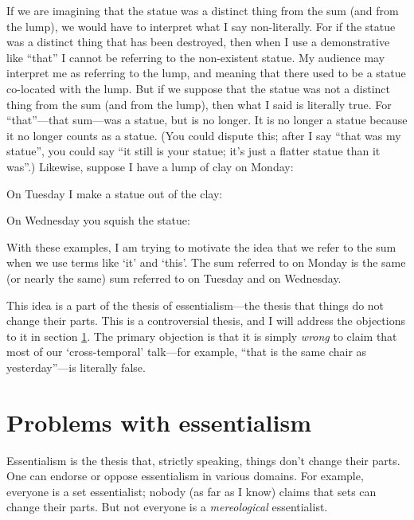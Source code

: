 \documentclass[11pt]{article}
\begin{document}
\begin{spacing}{1.5}
\begin{enumerate}
    If we are imagining that the statue was a distinct thing from the
    sum (and from the lump), we would have to interpret what I say
    non-literally.  For if the statue was a distinct thing that has
    been destroyed, then when I use a demonstrative like ``that'' I
    cannot be referring to the non-existent statue.  My audience may
    interpret me as referring to the lump, and meaning that there used
    to be a statue co-located with the lump.  But if we suppose that
    the statue was not a distinct thing from the sum (and from the
    lump), then what I said is literally true.  For ``that''---that
    sum---was a statue, but is no longer.  It is no longer a statue
    because it no longer counts as a statue.  (You could dispute this;
    after I say ``that was my statue'', you could say ``it still is
    your statue; it's just a flatter statue than it was''.)  Likewise,
    suppose I have a lump of clay on Monday:


    On Tuesday I make a statue out of the clay:


    On Wednesday you squish the statue:

\end{enumerate}

With these examples, I am trying to motivate the idea that we refer to
the sum when we use terms like `it' and `this'.  The sum referred to
on Monday is the same (or nearly the same) sum referred to on Tuesday
and on Wednesday.

This idea is a part of the thesis of essentialism---the thesis that
things do not change their parts.  This is a controversial thesis, and
I will address the objections to it in section \ref{essentialism}.
The primary objection is that it is simply {\em wrong} to claim that
most of our `cross-temporal' talk---for example, ``that is the same
chair as yesterday''---is literally false.

\section{Problems with essentialism}
\label{essentialism}
Essentialism is the thesis that, strictly speaking, things don't
change their parts.  One can endorse or oppose essentialism in various
domains.  For example, everyone is a set essentialist; nobody (as far
as I know) claims that sets can change their parts.  But not everyone
is a {\em mereological} essentialist.


\end{spacing}
\end{document}
